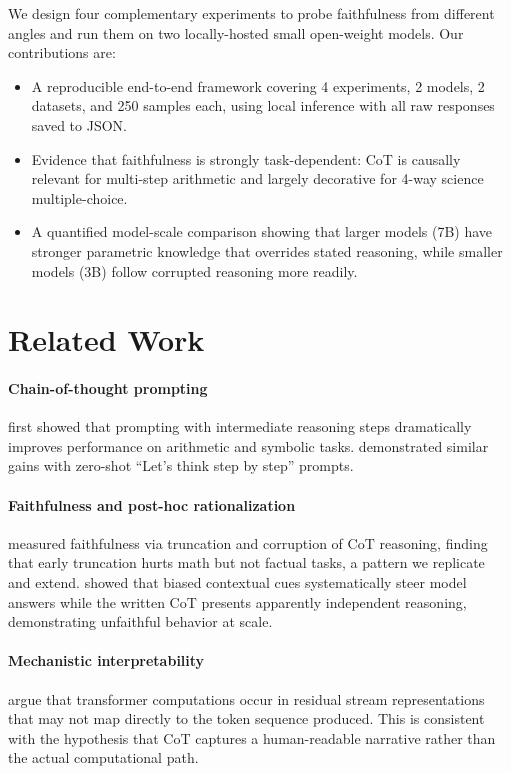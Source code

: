 \documentclass[11pt,twocolumn]{article}
\begin{document}
We design four complementary experiments to probe faithfulness from different
angles and run them on two locally-hosted small open-weight models. Our
contributions are:
\begin{itemize}
  \setlength\itemsep{0pt}
  \item A reproducible end-to-end framework covering 4 experiments, 2 models,
        2 datasets, and 250 samples each, using local inference with all raw
        responses saved to JSON.
  \item Evidence that faithfulness is strongly task-dependent: CoT is
        causally relevant for multi-step arithmetic and largely decorative
        for 4-way science multiple-choice.
  \item A quantified model-scale comparison showing that larger models (7B)
        have stronger parametric knowledge that overrides stated reasoning,
        while smaller models (3B) follow corrupted reasoning more readily.
\end{itemize}


\section{Related Work}

\paragraph{Chain-of-thought prompting}
\citet{wei2022chain} first showed that prompting with intermediate reasoning
steps dramatically improves performance on arithmetic and symbolic tasks.
\citet{kojima2022large} demonstrated similar gains with zero-shot ``Let's think
step by step'' prompts.

\paragraph{Faithfulness and post-hoc rationalization}
\citet{lanham2023measuring} measured faithfulness via truncation and corruption
of CoT reasoning, finding that early truncation hurts math but not factual
tasks, a pattern we replicate and extend. \citet{turpin2023language} showed
that biased contextual cues systematically steer model answers while the
written CoT presents apparently independent reasoning, demonstrating
unfaithful behavior at scale.

\paragraph{Mechanistic interpretability}
\citet{elhage2021mathematical} argue that transformer computations occur in
residual stream representations that may not map directly to the token
sequence produced. This is consistent with the hypothesis that CoT captures
a human-readable narrative rather than the actual computational path.
\end{document}
